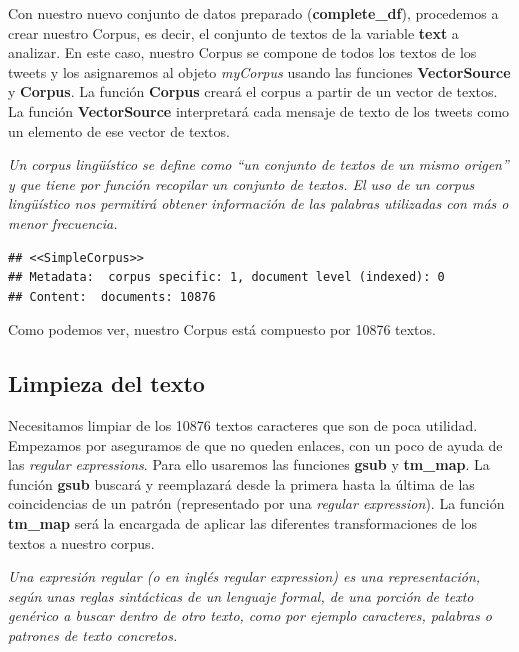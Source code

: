 \documentclass[
]{article}
\newenvironment{Shaded}{\begin{snugshade}}{\end{snugshade}}
\newcommand{\KeywordTok}[1]{\textcolor[rgb]{0.13,0.29,0.53}{\textbf{#1}}}
\newcommand{\NormalTok}[1]{#1}
\newcommand{\OperatorTok}[1]{\textcolor[rgb]{0.81,0.36,0.00}{\textbf{#1}}}
\newcommand{\StringTok}[1]{\textcolor[rgb]{0.31,0.60,0.02}{#1}}
\begin{document}
Con nuestro nuevo conjunto de datos preparado (\textbf{complete\_df}),
procedemos a crear nuestro Corpus, es decir, el conjunto de textos de la
variable \textbf{text} a analizar. En este caso, nuestro Corpus se
compone de todos los textos de los tweets y los asignaremos al objeto
\emph{myCorpus} usando las funciones \textbf{VectorSource} y
\textbf{Corpus}. La función \textbf{Corpus} creará el corpus a partir de
un vector de textos. La función \textbf{VectorSource} interpretará cada
mensaje de texto de los tweets como un elemento de ese vector de textos.

\emph{Un corpus lingüístico se define como ``un conjunto de textos de un
mismo origen'' y que tiene por función recopilar un conjunto de textos.
El uso de un corpus lingüístico nos permitirá obtener información de las
palabras utilizadas con más o menor frecuencia.}

\begin{Shaded}
\end{Shaded}

\begin{verbatim}
## <<SimpleCorpus>>
## Metadata:  corpus specific: 1, document level (indexed): 0
## Content:  documents: 10876
\end{verbatim}

Como podemos ver, nuestro Corpus está compuesto por 10876 textos.

\hypertarget{limpieza-del-texto}{%
\subsection{Limpieza del texto}\label{limpieza-del-texto}}

Necesitamos limpiar de los 10876 textos caracteres que son de poca
utilidad. Empezamos por aseguramos de que no queden enlaces, con un poco
de ayuda de las \emph{regular expressions}. Para ello usaremos las
funciones \textbf{gsub} y \textbf{tm\_map}. La función \textbf{gsub}
buscará y reemplazará desde la primera hasta la última de las
coincidencias de un patrón (representado por una \emph{regular
expression}). La función \textbf{tm\_map} será la encargada de aplicar
las diferentes transformaciones de los textos a nuestro corpus.

\emph{Una expresión regular (o en inglés regular expression) es una
representación, según unas reglas sintácticas de un lenguaje formal, de
una porción de texto genérico a buscar dentro de otro texto, como por
ejemplo caracteres, palabras o patrones de texto concretos.}
\end{document}
